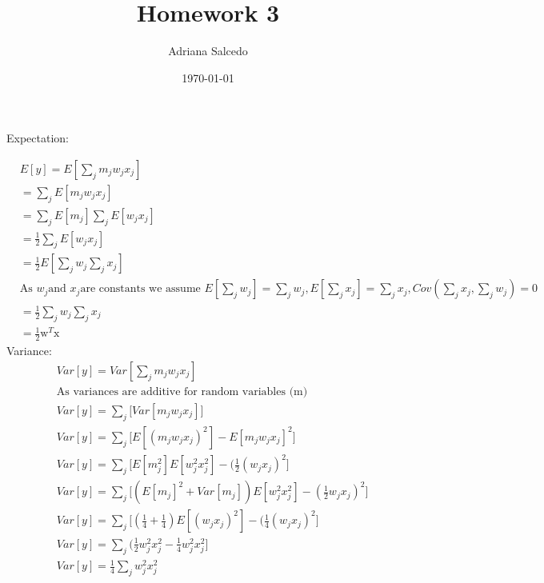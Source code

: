 \documentclass[12pt,letterpaper]{article} %
\title{\Large Homework 3}
\author{\large Adriana Salcedo}
\date{\large \today}
\newcommand{\bs}[1]{\bm{\mathrm{#1}}} %
\newcommand{\sumj}{\sum_j}
\begin{document}
\maketitle
\section{}
\subsection{}
Expectation:

\begin{align}
&E[y] = E[\sum_j m_jw_jx_j] \\
&= \sum_jE[m_jw_jx_j]\\
&= \sum_jE[m_j]\sumj E[w_jx_j]\\
&=\frac{1}{2}\sumj E[w_jx_j]\\
&=\frac{1}{2}E[\sumj w_j\sumj x_j]\\
&\text{As } w_j \text{and } x_j \text{are constants we assume }E[\sumj w_j]=\sumj w_j, E[\sumj x_j]=\sumj x_j, Cov(\sumj x_j,\sumj w_j) = 0\\
&=\frac{1}{2}\sumj w_j \sumj x_j\\
&=\frac{1}{2}\bs{w}^T\bs{x}
\end{align}
Variance:
\begin{align}
&Var[y] = Var[\sum_j m_jw_jx_j] \\
&\text{As variances are additive for random variables (m)}\\
&Var[y] = \sumj\big[ Var[m_jw_jx_j]\big] \\
&Var[y] = \sumj\big[ E[(m_jw_jx_j)^2] - E[m_jw_jx_j]^2\big] \\
&Var[y] = \sumj\big[ E[m_j^2]E[w_j^2x_j^2] - (\frac{1}{2}(w_jx_j)^2\big] \\
&Var[y] = \sumj\big[(E[m_j]^2+Var[m_j])E[w_j^2x_j^2] - (\frac{1}{2}w_jx_j)^2\big] \\
&Var[y] = \sumj\big[(\frac{1}{4}+\frac{1}{4})E[(w_jx_j)^2] - (\frac{1}{4}(w_jx_j)^2\big] \\
&Var[y] = \sumj\big(\frac{1}{2}w_j^2x_j^2-\frac{1}{4}w_j^2x_j^2\big] \\
&Var[y] = \frac{1}{4}\sumj w_j^2x_j^2 
\end{align}
\end{document}
